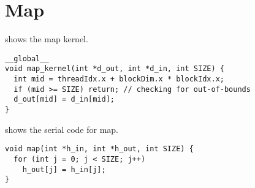 \section{Map}
\label{sec:map}

 shows the map kernel.

\begin{lstlisting}[caption={Map kernel}, label={lst:map par}]
__global__ 
void map_kernel(int *d_out, int *d_in, int SIZE) {
  int mid = threadIdx.x + blockDim.x * blockIdx.x;
  if (mid >= SIZE) return; // checking for out-of-bounds
  d_out[mid] = d_in[mid];
}
\end{lstlisting}

 shows the serial code for map.

\begin{lstlisting}[caption={Serial map}, label={lst:map seq}]
void map(int *h_in, int *h_out, int SIZE) {
  for (int j = 0; j < SIZE; j++) 
    h_out[j] = h_in[j];
}
\end{lstlisting}
